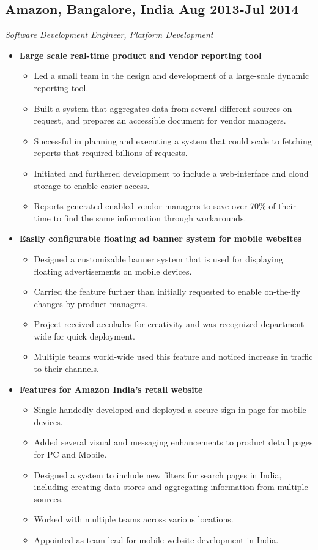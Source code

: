 \documentclass[10pt,letterpaper,sans]{moderncv}        %
\begin{document}
\subsection{\textbf{Amazon}, Bangalore, India \small{Aug 2013-Jul 2014}}
\textit{Software Development Engineer, Platform Development}
\begin{small}
\begin{itemize}

\item \textbf{Large scale real-time product and vendor reporting tool}
\begin{itemize}
\item Led a small team in the design and development of a large-scale dynamic reporting tool.
\item Built a system that aggregates data from several different sources on request, and prepares an accessible document for vendor managers.
\item Successful in planning and executing a system that could scale to fetching reports that required billions of requests.
\item Initiated and furthered development to include a web-interface and cloud storage to enable easier access.
\item Reports generated enabled vendor managers to save over 70\% of their time to find the same information through workarounds.
\end{itemize}

\item \textbf{Easily configurable floating ad banner system for mobile websites}
\begin{itemize}
\item Designed a customizable banner system that is used for displaying floating advertisements on mobile devices.
\item Carried the feature further than initially requested to enable on-the-fly changes by product managers.
\item Project received accolades for creativity and was recognized department-wide for quick deployment.
\item Multiple teams world-wide used this feature and noticed increase in traffic to their channels.
\end{itemize}

\item \textbf{Features for Amazon India's retail website}
\begin{itemize}
\item Single-handedly developed and deployed a secure sign-in page for mobile devices.
\item Added several visual and messaging enhancements to product detail pages for PC and Mobile.
\item Designed a system to include new filters for search pages in India, including creating data-stores and aggregating information from multiple sources.
\item Worked with multiple teams across various locations.
\item Appointed as team-lead for mobile website development in India.
\end{itemize}


\end{itemize}
\end{small}
\end{document}
